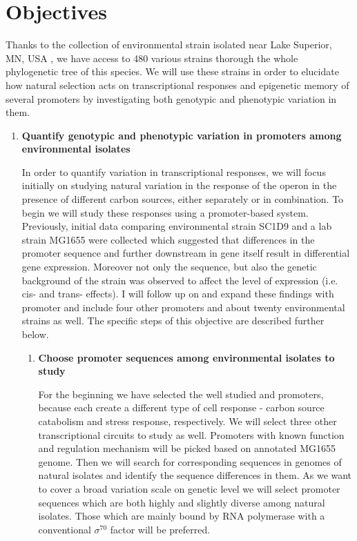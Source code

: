 \chapter*{Objectives}

\shorthandoff{-} 

Thanks to the collection of environmental  strain isolated near Lake Superior, MN, USA \cite{ishii2006presence}, we have access to 480 various strains thorough the whole phylogenetic tree of this species.
We will use these strains in order to elucidate how natural selection acts on transcriptional responses and epigenetic memory of several promoters by investigating both genotypic and phenotypic variation in them.

\begin{enumerate}[font=\bfseries]

	\item \textbf{Quantify genotypic and phenotypic variation in promoters among environmental  isolates}
	
	In order to quantify variation in transcriptional responses, we will focus initially on studying natural variation in the response of the  operon in the presence of different carbon sources, either separately or in combination.
	To begin we will study these responses using a promoter-based system.
	Previously, initial data comparing environmental strain SC1\textunderscore D9 and a lab strain MG1655 were collected which suggested that differences in the  promoter sequence and further downstream in  gene itself result in differential gene expression.
	Moreover not only the sequence, but also the genetic background of the strain was observed to affect the level of expression (i.e. cis- and trans- effects).
	I will follow up on and expand these findings with  promoter and include four other promoters and about twenty environmental  strains as well.
	The specific steps of this objective are described further below.

	\begin{enumerate}[font=\bfseries]
	
		\item \textbf{Choose promoter sequences among environmental  isolates to study}
		
		For the beginning we have selected the well studied  and  promoters, because each create a different type of cell response - carbon source catabolism and stress response, respectively.
		We will select three other transcriptional circuits to study as well.
		Promoters with known function and regulation mechanism will be picked based on annotated MG1655 genome.
		Then we will search for corresponding sequences in genomes of natural isolates and identify the sequence differences in them.
		As we want to cover a broad variation scale on genetic level we will select promoter sequences which are both highly and slightly diverse among natural isolates.
		Those which are mainly bound by RNA polymerase with a conventional $\sigma^{70}$ factor will be preferred.



\end{enumerate}
\end{enumerate}
